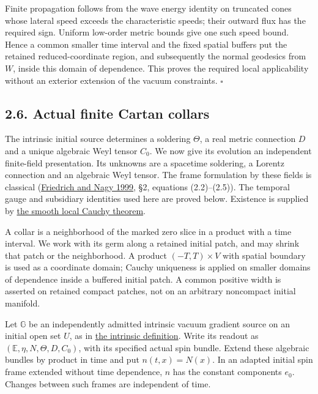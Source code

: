 \documentclass[
  english,
  11pt,
  reqno]{amsart}
\begin{document}
Finite propagation follows from the wave energy identity on truncated
cones whose lateral speed exceeds the characteristic speeds; their
outward flux has the required sign. Uniform low-order metric bounds give
one such speed bound. Hence a common smaller time interval and the fixed
spatial buffers put the retained reduced-coordinate region, and
subsequently the normal geodesics from \(W\), inside this domain of
dependence. This proves the required local applicability without an
exterior extension of the vacuum constraints. \hfill\(\square\)

\subsection{2.6. Actual finite Cartan
collars}\label{actual-finite-cartan-collars}\label{sec:online-finite-cartan-collars}

The intrinsic initial source determines a soldering \(\Theta\), a real
metric connection \(D\) and a unique algebraic Weyl tensor \(C_0\). We
now give its evolution an independent finite-field presentation. Its
unknowns are a spacetime soldering, a Lorentz connection and an
algebraic Weyl tensor. The frame formulation by these fields is
classical (\hyperref[ref-FriedrichNagy1999]{Friedrich and Nagy 1999},
§2, equations (2.2)--(2.5)). The temporal gauge and subsidiary
identities used here are proved below. Existence is supplied by
\hyperref[thm:online-smooth-local-cauchy-input]{the smooth local Cauchy
theorem}.

A collar is a neighborhood of the marked zero slice in a product with a
time interval. We work with its germ along a retained initial patch, and
may shrink that patch or the neighborhood. A product \((-T,T)\times V\)
with spatial boundary is used as a coordinate domain; Cauchy uniqueness
is applied on smaller domains of dependence inside a buffered initial
patch. A common positive width is asserted on retained compact patches,
not on an arbitrary noncompact initial manifold.

Let \(\mathbb G\) be an independently admitted intrinsic vacuum gradient
source on an initial open set \(U\), as in
\hyperref[def:online-intrinsic-vacuum-gradient]{the intrinsic
definition}. Write its readout as \((\mathbb E,\eta,N,\Theta,D,C_0)\),
with its specified actual spin bundle. Extend these algebraic bundles by
product in time and put \(n(t,x)=N(x)\). In an adapted initial spin
frame extended without time dependence, \(n\) has the constant
components \(e_0\). Changes between such frames are independent of time.
\end{document}
